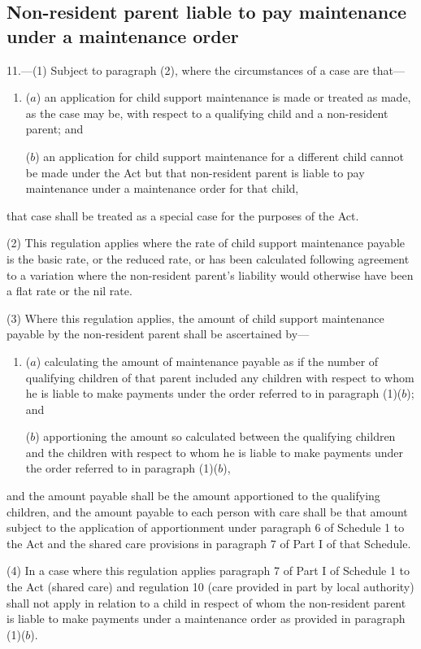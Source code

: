 \documentclass[12pt,a4paper]{article}
\begin{document}
\subsection[11. Non-resident parent liable to pay maintenance under a maintenance order]{\sloppy{} Non-resident parent liable to pay maintenance under a maintenance order}

11.---(1)  Subject to paragraph (2), where the circumstances of a case are that—
\begin{enumerate}\item[]
($a$) an application for child support maintenance is made or treated as made, as the case may be, with respect to a qualifying child and a non-resident parent; and

($b$) an application for child support maintenance for a different child cannot be made under the Act but that non-resident parent is liable to pay maintenance under a maintenance order for that child,
\end{enumerate}
that case shall be treated as a special case for the purposes of the Act.

(2) This regulation applies where the rate of child support maintenance payable is the basic rate, or the reduced rate, or has been calculated following agreement to a variation where the non-resident parent’s liability would otherwise have been a flat rate or the nil rate.

(3) Where this regulation applies, the amount of child support maintenance payable by the non-resident parent shall be ascertained by—
\begin{enumerate}\item[]
($a$) calculating the amount of maintenance payable as if the number of qualifying children of that parent included any children with respect to whom he is liable to make payments under the order referred to in paragraph (1)($b$); and

($b$) apportioning the amount so calculated between the qualifying children and the children with respect to whom he is liable to make payments under the order referred to in paragraph (1)($b$),
\end{enumerate}
and the amount payable shall be the amount apportioned to the qualifying children, and the amount payable to each person with care shall be that amount subject to the application of apportionment under paragraph 6 of Schedule 1 to the Act and the shared care provisions in paragraph 7 of Part I of that Schedule.

(4) In a case where this regulation applies paragraph 7 of Part I of Schedule 1 to the Act (shared care) and regulation 10 (care provided in part by local authority) shall not apply in relation to a child in respect of whom the non-resident parent is liable to make payments under a maintenance order as provided in paragraph (1)($b$).
\end{document}

